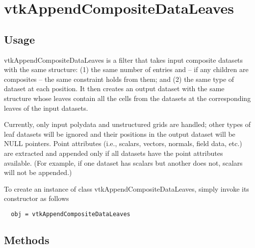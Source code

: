\section{vtkAppendCompositeDataLeaves}

\subsection{Usage}

 vtkAppendCompositeDataLeaves is a filter that takes input composite datasets with the same
 structure: (1) the same number of entries and -- if any children are composites -- the
 same constraint holds from them; and (2) the same type of dataset at each position.
 It then creates an output dataset with the same structure whose leaves contain all the
 cells from the datasets at the corresponding leaves of the input datasets.

 Currently, only input polydata and unstructured grids are handled; other types of
 leaf datasets will be ignored and their positions in the output dataset will be NULL pointers.
 Point attributes (i.e., scalars, vectors, normals, field data, etc.) are extracted 
 and appended only if all datasets have the point attributes available. 
 (For example, if one dataset has scalars but another does not, scalars will 
 not be appended.)


To create an instance of class vtkAppendCompositeDataLeaves, simply
invoke its constructor as follows
\begin{verbatim}
  obj = vtkAppendCompositeDataLeaves
\end{verbatim}
\subsection{Methods}


